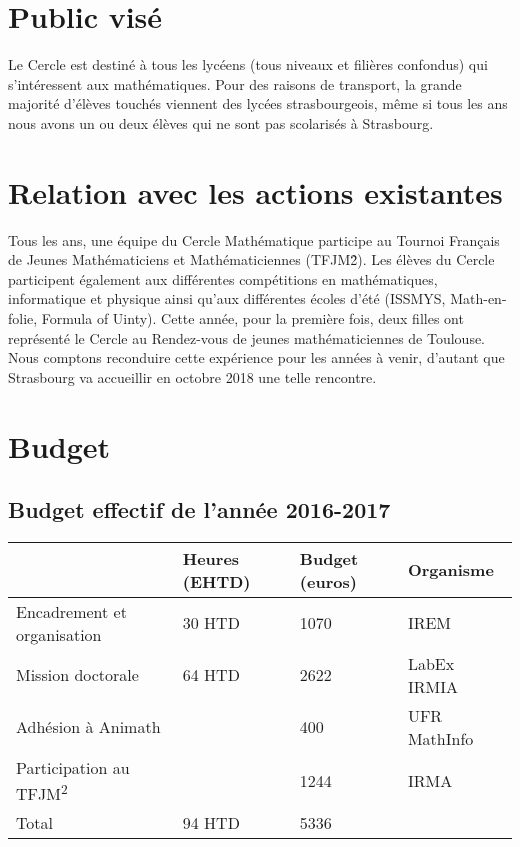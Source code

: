 \documentclass[11pt,notitlepage]{article}
\begin{document}
\section{Public vis\'e}

Le Cercle est destin\'e \`a tous les lyc\'eens (tous niveaux et fili\`eres confondus) qui s'int\'eressent aux math\'ematiques. Pour des raisons de transport, la grande majorit\'e d'\'el\`eves 
touch\'es viennent des lyc\'ees strasbourgeois, m\^eme si tous les ans nous avons un ou deux \'el\`eves qui ne sont pas scolaris\'es \`a Strasbourg. 

\section{Relation avec les actions existantes}
Tous les ans, une \'equipe du Cercle Math\'ematique participe au Tournoi Fran\c{c}ais de Jeunes Math\'ematiciens et Math\'ematiciennes (TFJM\^2). Les \'el\`eves du Cercle participent \'egalement 
aux diff\'erentes comp\'etitions en math\'ematiques, informatique et physique ainsi qu'aux diff\'erentes \'ecoles d'\'et\'e (ISSMYS, Math-en-folie, Formula of Uinty). 
Cette ann\'ee, pour la premi\`ere fois, deux filles ont repr\'esent\'e le Cercle au Rendez-vous de jeunes math\'ematiciennes de Toulouse. Nous comptons reconduire cette exp\'erience
 pour les ann\'ees \`a venir, d'autant que Strasbourg va accueillir en octobre 2018 une telle rencontre.


\section{Budget}

\subsection{Budget effectif de l'ann\'ee 2016-2017}

\begin{center}
	\begin{tabular}{|p{4 cm}|p{2cm}|p{2cm}|l|}
	\hline
	& Heures (EHTD) & Budget (euros) & Organisme\\
	\hline
	Encadrement et organisation& 30 HTD& 1070 & IREM\\
	\hline 
	Mission doctorale & 64 HTD &2622 & LabEx IRMIA\\
	\hline 
	Adh\'esion \`a Animath& & 400 & UFR MathInfo\\
	\hline
	Participation au TFJM\textsuperscript{2}& & 1244 & IRMA\\
	\hline
	Total & 94 HTD&  5336& \\
	\hline	
\end{tabular}
\end{center}
\end{document}
